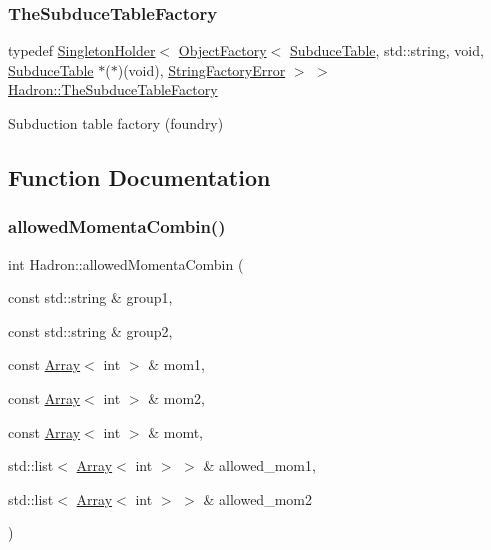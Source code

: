 \subsubsection{\texorpdfstring{TheSubduceTableFactory}{TheSubduceTableFactory}}
{\footnotesize\ttfamily typedef \mbox{\hyperlink{classUtil_1_1SingletonHolder}{Singleton\+Holder}}$<$ \mbox{\hyperlink{classUtil_1_1ObjectFactory}{Object\+Factory}}$<$ \mbox{\hyperlink{classHadron_1_1SubduceTable}{Subduce\+Table}}, std\+::string, void, \mbox{\hyperlink{classHadron_1_1SubduceTable}{Subduce\+Table}} $\ast$($\ast$)(void), \mbox{\hyperlink{structUtil_1_1StringFactoryError}{String\+Factory\+Error}} $>$ $>$ \mbox{\hyperlink{namespaceHadron_a48cb722d69c0afc5a2ebda0eaf6fea13}{Hadron\+::\+The\+Subduce\+Table\+Factory}}}



Subduction table factory (foundry) 



\subsection{Function Documentation}
\mbox{\label{namespaceHadron_a9aa2554e3522f9947be804d36603b887}} 
\subsubsection{\texorpdfstring{allowedMomentaCombin()}{allowedMomentaCombin()}}
{\footnotesize\ttfamily int Hadron\+::allowed\+Momenta\+Combin (\begin{DoxyParamCaption}\item[{const std\+::string \&}]{group1,  }\item[{const std\+::string \&}]{group2,  }\item[{const \mbox{\hyperlink{classXMLArray_1_1Array}{Array}}$<$ int $>$ \&}]{mom1,  }\item[{const \mbox{\hyperlink{classXMLArray_1_1Array}{Array}}$<$ int $>$ \&}]{mom2,  }\item[{const \mbox{\hyperlink{classXMLArray_1_1Array}{Array}}$<$ int $>$ \&}]{momt,  }\item[{std\+::list$<$ \mbox{\hyperlink{classXMLArray_1_1Array}{Array}}$<$ int $>$ $>$ \&}]{allowed\+\_\+mom1,  }\item[{std\+::list$<$ \mbox{\hyperlink{classXMLArray_1_1Array}{Array}}$<$ int $>$ $>$ \&}]{allowed\+\_\+mom2 }\end{DoxyParamCaption})}



